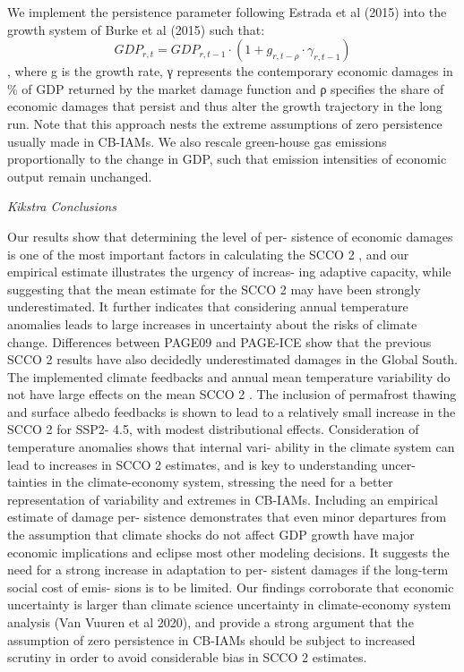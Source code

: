 \documentclass[
]{book}
\begin{document}
We implement the persistence parameter following
Estrada et al (2015) into the growth system of Burke
et al (2015) such that:
\[GDP_{r , t} = GDP_{r , t − 1} · (1 + g_{r , t − ρ} · γ_{r , t − 1} )\],
where g is the growth rate, γ represents
the contemporary economic damages in \% of GDP
returned by the market damage function and ρ specifies
the share of economic damages that persist and
thus alter the growth trajectory in the long run. Note
that this approach nests the extreme assumptions
of zero persistence usually made in CB-IAMs.
We also rescale green-house gas emissions proportionally to the change in
GDP, such that emission intensities of economic output remain unchanged.

\emph{Kikstra Conclusions}

Our results show that determining the level of per-
sistence of economic damages is one of the most
important factors in calculating the SCCO 2 , and our
empirical estimate illustrates the urgency of increas-
ing adaptive capacity, while suggesting that the mean
estimate for the SCCO 2 may have been strongly
underestimated. It further indicates that considering
annual temperature anomalies leads to large increases
in uncertainty about the risks of climate change.
Differences between PAGE09 and PAGE-ICE show
that the previous SCCO 2 results have also decidedly
underestimated damages in the Global South.
The implemented climate feedbacks and annual
mean temperature variability do not have large effects
on the mean SCCO 2 . The inclusion of permafrost
thawing and surface albedo feedbacks is shown to lead
to a relatively small increase in the SCCO 2 for SSP2-
4.5, with modest distributional effects. Consideration
of temperature anomalies shows that internal vari-
ability in the climate system can lead to increases in
SCCO 2 estimates, and is key to understanding uncer-
tainties in the climate-economy system, stressing the
need for a better representation of variability and
extremes in CB-IAMs.
Including an empirical estimate of damage per-
sistence demonstrates that even minor departures
from the assumption that climate shocks do not affect
GDP growth have major economic implications and
eclipse most other modeling decisions. It suggests
the need for a strong increase in adaptation to per-
sistent damages if the long-term social cost of emis-
sions is to be limited. Our findings corroborate that
economic uncertainty is larger than climate science
uncertainty in climate-economy system analysis (Van
Vuuren et al 2020), and provide a strong argument
that the assumption of zero persistence in CB-IAMs
should be subject to increased scrutiny in order to
avoid considerable bias in SCCO 2 estimates.
\end{document}
